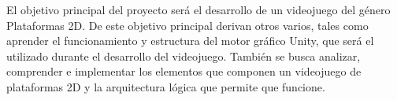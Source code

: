 
El objetivo principal del proyecto será el desarrollo de un videojuego del género Plataformas 2D. De este objetivo principal derivan otros varios, tales como aprender el funcionamiento y estructura del motor gráfico Unity, que será el utilizado durante el desarrollo del videojuego. También se busca analizar, comprender e implementar los elementos que componen un videojuego de plataformas 2D y la arquitectura lógica que permite que funcione.
